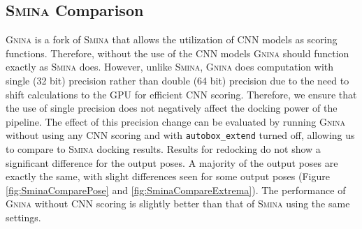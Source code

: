 \documentclass[journal=jcisd8,manuscript=article]{achemso}
\begin{document}
\subsection{{\normalfont\scshape Smina} Comparison}
\textsc{Gnina} is a fork of \textsc{Smina} that allows the utilization of CNN models as scoring functions. Therefore, without the use of the CNN models \textsc{Gnina} should function exactly as \textsc{Smina} does. However, unlike \textsc{Smina}, \textsc{Gnina} does computation with single (32 bit) precision rather than double (64 bit) precision due to the need to shift calculations to the GPU for efficient CNN scoring. Therefore, we ensure that the use of single precision does not negatively affect the docking power of the pipeline. The effect of this precision change can be evaluated by running \textsc{Gnina} without using any CNN scoring and with \texttt{autobox\_extend} turned off, allowing us to compare to \textsc{Smina} docking results. Results for redocking do not show a significant difference for the output poses. A majority of the output poses are exactly the same, with slight differences seen for some output poses (Figure \ref{fig:SminaComparePose} and \ref{fig:SminaCompareExtrema}). The performance of \textsc{Gnina} without CNN scoring is slightly better than that of \textsc{Smina} using the same settings.
\end{document}
